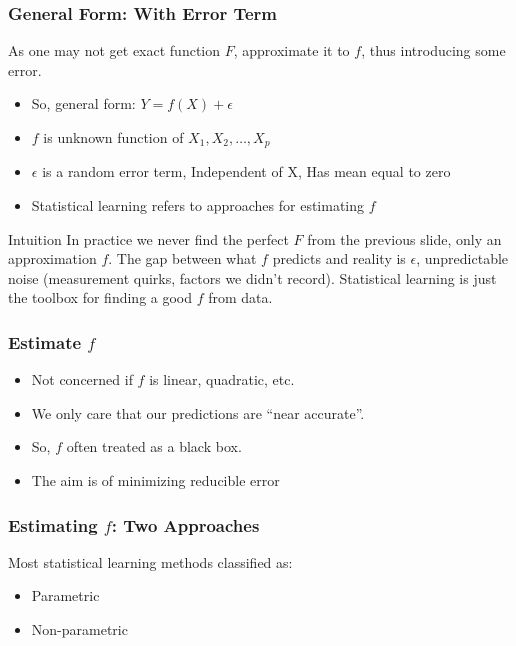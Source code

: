 \begin{frame}[fragile]\frametitle{General Form: With Error Term}
As one may not get exact function $F$, approximate it to $f$, thus introducing some error.
\begin{itemize}
\item So, general form: $Y = f(X) + \epsilon$
\item $f$ is unknown function of ${X_1, X_2, \ldots, X_p}$
\item  $\epsilon$ is a random error term, Independent of X, Has mean equal to zero
\item Statistical learning refers to approaches for estimating $f$
\end{itemize}
\begin{block}{Intuition}
In practice we never find the perfect $F$ from the previous slide, only an approximation $f$. The gap between what $f$ predicts and reality is $\epsilon$, unpredictable noise (measurement quirks, factors we didn't record). Statistical learning is just the toolbox for finding a good $f$ from data.
\end{block}
\end{frame}



\begin{frame}[fragile]\frametitle{Estimate $f$}
\begin{itemize}
\item Not concerned if $f$ is linear, quadratic, etc.
\item We only care that our predictions are ``near accurate''.
\item So, $f$ often treated as a black box. 
\item The aim is of minimizing reducible error
\end{itemize}
\end{frame}


\begin{frame}[fragile]\frametitle{Estimating $f$: Two Approaches}
Most statistical learning methods classified as:
	\begin{itemize}
	\item Parametric
	\item Non-parametric
	\end{itemize}
\end{frame}

